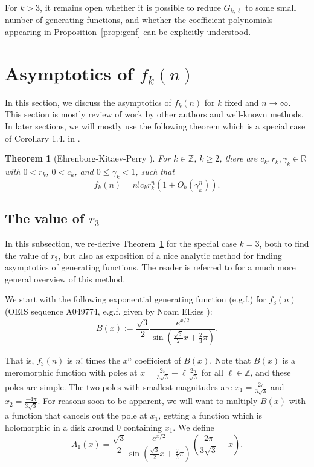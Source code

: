 \documentclass{amsart}
\newtheorem{theorem}{Theorem}[section]
\theoremstyle{definition}
\begin{document}
For $k>3$, it remains open whether it is possible to reduce $G_{k,\ell}$ to some small number of generating functions, and whether the coefficient polynomials appearing in Proposition~\ref{prop:genf} can be explicitly understood.


\section{Asymptotics of $f_k(n)$}\label{sec:nasy}

In this section, we discuss the asymptotics of $f_k(n)$ for $k$ fixed and $n\to \infty$. This section is mostly review of work by other authors and well-known methods. In later sections, we will mostly use the following theorem which is a special case of Corollary 1.4. in \cite{kitaev}.

\begin{theorem}[Ehrenborg-Kitaev-Perry \cite{kitaev}]\label{thm:nasy}
For $k\in \mathbb{Z}$, $k\geq 2$, there are $c_k,r_k,\gamma_k\in \mathbb{R}$ with $0<r_k$, $0<c_k$, and $0\leq \gamma_k<1$, such that
\[f_k(n)=n!c_k r_k^n\left(1+O_k(\gamma_k^n)\right).\]
\end{theorem}

\subsection{The value of $r_3$}

In this subsection, we re-derive Theorem~\ref{thm:nasy} for the special case $k=3$, both to find the value of $r_3$, but also as exposition of a nice analytic method for finding asymptotics of generating functions. The reader is referred to \cite{flajolet} for a much more general overview of this method.

We start with the following exponential generating function (e.g.f.) for $f_3(n)$ (OEIS sequence A049774, e.g.f. given by Noam Elkies \cite{oeis}):
\[B(x):=\frac{\sqrt{3}}{2}\frac{e^{x/2}}{\sin\left(\frac{\sqrt{3}}{2}x+\frac{2}{3}\pi\right)}.\]

That is, $f_3(n)$ is $n!$ times the $x^n$ coefficient of $B(x)$. Note that $B(x)$ is a meromorphic function with poles at $x=\frac{2\pi}{3\sqrt{3}}+\ell \frac{2\pi}{\sqrt{3}}$ for all $\ell\in \mathbb{Z}$, and these poles are simple. The two poles with smallest magnitudes are $x_1=\frac{2\pi}{3\sqrt{3}}$ and $x_2=\frac{-4\pi}{3\sqrt{3}}$. For reasons soon to be apparent, we will want to multiply $B(x)$ with a function that cancels out the pole at $x_1$, getting a function which is holomorphic in a disk around $0$ containing $x_1$. We define
\[A_1(x)=\frac{\sqrt{3}}{2}\frac{e^{x/2}}{\sin\left(\frac{\sqrt{3}}{2}x+\frac{2}{3}\pi\right)}\left(\frac{2\pi}{3\sqrt{3}}-x\right).\]
\end{document}
